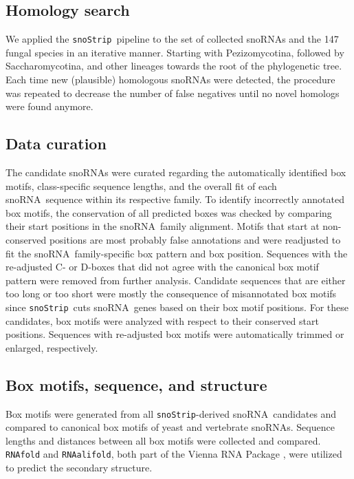 \documentclass[preprint,3p,times,twocolumn]{elsarticle}
\newcommand{\PFS}[1]{\begingroup\color{green}#1\endgroup}
\newcommand{\sno}{snoRNA}
\newcommand{\snostrip}{\texttt{snoStrip}}
\begin{document}
\subsection{Homology search}

We applied the \snostrip\ pipeline \cite{Bartschat:2014} to the set
of collected snoRNAs and the 147 fungal species in an iterative
manner. Starting with Pezizomycotina, followed by Saccharomycotina,
and other lineages towards the root of the phylogenetic tree. Each
time new (plausible) homologous snoRNAs were detected, the procedure
was repeated to decrease the number of false negatives until no novel
homologs were found anymore.

\subsection{Data curation}

The candidate snoRNAs were curated regarding the automatically identified
box motifs, class-specific sequence lengths, and the overall fit of
each \sno\ sequence \PFS{within} its respective family. To identify
incorrectly annotated box motifs, the conservation of all predicted boxes
was checked by comparing their start positions in the \sno\ family
alignment. Motifs that start at \PFS{non-conserved} positions are most
probably false annotations and were readjusted to fit the \sno\
family-specific box pattern and box position.  Sequences \PFS{with the
  re-adjusted} C- or D-boxes \PFS{that} did not agree with the canonical
box motif pattern were removed from further analysis.  Candidate sequences
that are either too long or too short were mostly the consequence of
misannotated box motifs since \snostrip\ cuts \sno\ genes based on their
box motif positions. For these candidates, box motifs were analyzed with
respect to their conserved start positions.  Sequences with re-adjusted box
motifs were automatically trimmed or enlarged, respectively.

\subsection{Box motifs, sequence, and structure}

Box motifs were generated from all \snostrip-derived \sno\ candidates
and compared to canonical box motifs of yeast and vertebrate snoRNAs.
Sequence lengths and distances between all box motifs were collected
and compared. \texttt{RNAfold} and \texttt{RNAalifold}, both part of
the Vienna RNA Package \cite{Hofacker:1994}, were utilized to predict
the secondary structure.
\end{document}

